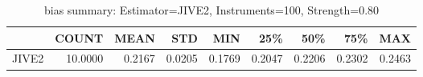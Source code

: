 \begin{table}[ht]
\centering
\caption{bias summary: Estimator=JIVE2, Instruments=100, Strength=0.80}
\begin{tabular}{lrrrrrrrr}
\toprule
 & COUNT & MEAN & STD & MIN & 25\% & 50\% & 75\% & MAX \\
\midrule
JIVE2 & 10.0000 & 0.2167 & 0.0205 & 0.1769 & 0.2047 & 0.2206 & 0.2302 & 0.2463 \\
\bottomrule
\end{tabular}
\end{table}
